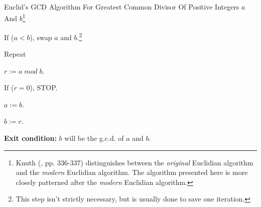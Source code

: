 \begin{vworkalgorithmstatementpar}
   {Euclid's GCD Algorithm For Greatest Common Divisor Of Positive
   Integers \mbox{\boldmath $a$} 
   And \mbox{\boldmath $b$}}\hspace{-0.4em}\footnote{Knuth
(\cite{bibref:b:knuthclassic2ndedvol2}, pp. 336-337) distinguishes between the \emph{original}
Euclidian algorithm and the \emph{modern} Euclidian algorithm.  The algorithm presented here
is more closely patterned after the \emph{modern} Euclidian algorithm.}
\label{alg:ccfr0:sega0:euclidsgcdalgorithm}
\begin{alglvl0}
\item If ($a < b$), swap $a$ and $b$.\footnote{This step isn't strictly necessary, but is usually done
      to save one iteration.}
\item Repeat
   \begin{alglvl1}
   \item $r := a \; mod \; b$.
   \item If ($r = 0$), STOP.
   \item $a := b$.
   \item $b := r$.
   \end{alglvl1}
\item \textbf{Exit condition:} $b$ will be the g.c.d. of $a$ and $b$.
\end{alglvl0}
\end{vworkalgorithmstatementpar}
